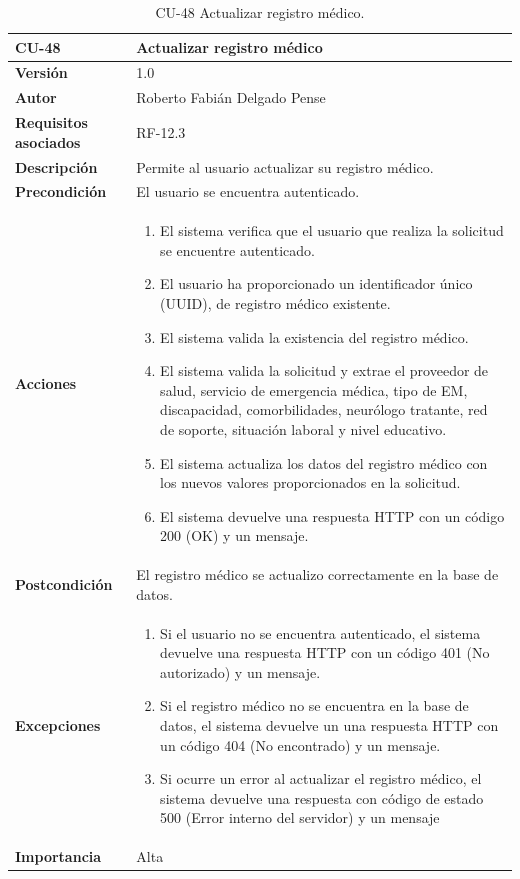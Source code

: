 \begin{table}[p]
	\centering
	\begin{tabularx}{\linewidth}{ p{} p{} }
		\toprule
		\textbf{CU-48}    & \textbf{Actualizar registro médico}\\
		\toprule
		\textbf{Versión}              & 1.0    \\
		\textbf{Autor}                & Roberto Fabián Delgado Pense \\
		\textbf{Requisitos asociados} & RF-12.3 \\ 
		\textbf{Descripción}          & Permite al usuario actualizar su registro médico. \\
		\textbf{Precondición}         & El usuario se encuentra autenticado. \\
		\textbf{Acciones}             &
		\begin{enumerate}
			\def\labelenumi{\arabic{enumi}.}
			\tightlist
                \item El sistema verifica que el usuario que realiza la solicitud se encuentre autenticado.
			\item El usuario ha proporcionado un identificador único (UUID), de registro médico existente.
			\item El sistema valida la existencia del registro médico.
                \item El sistema valida la solicitud y extrae el proveedor de salud, servicio de emergencia médica, tipo de EM, discapacidad, comorbilidades, neurólogo tratante, red de soporte, situación laboral y nivel educativo.
                \item El sistema actualiza los datos del registro médico con los nuevos valores proporcionados en la solicitud.
                \item El sistema devuelve una respuesta HTTP con un código 200 (OK) y un mensaje.
            \end{enumerate}\\
		\textbf{Postcondición}        & El registro médico se actualizo correctamente en la base de datos.\\
		\textbf{Excepciones}          & 
            \begin{enumerate}
			\def\labelenumi{\arabic{enumi}.}
			\tightlist
   			\item Si el usuario no se encuentra autenticado, el sistema devuelve una respuesta HTTP con un código 401 (No autorizado) y un mensaje.
                \item   Si el registro médico no se encuentra en la base de datos, el sistema devuelve un                           una respuesta HTTP con un código 404 (No encontrado) y un mensaje. 
                \item Si ocurre un error al actualizar el registro médico, el sistema devuelve una respuesta con código de estado 500 (Error interno del servidor) y un mensaje
            \end{enumerate}\\
		\textbf{Importancia}          & Alta \\
		\bottomrule
	\end{tabularx}
	\caption{CU-48 Actualizar registro médico.}
\end{table}